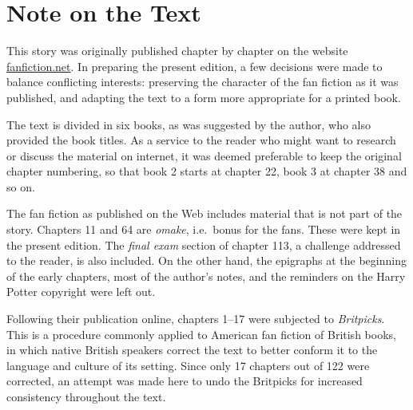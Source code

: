


\frontmatter
\newcommand{\hpBookNo}{1}
\newcommand{\hpBookChar}{Harry James Potter-Evans-Verres}
\newcommand{\hpBookTitle}{Methods of Rationality}


\cleartorecto
\chapter{Note on the Text}
This story was originally published chapter by chapter on the website
\href{https://www.fanfiction.net/s/5782108/1/Harry-Potter-and-the-Methods-of-Rationality}{\UrlFont fanfiction.net}.
In preparing the present edition, a few decisions were made to balance
conflicting interests: preserving the character of the fan fiction as it was
published, and adapting the text to a form more appropriate for a printed book.

The text is divided in six books, as was suggested by the author, who also
provided the book titles. As a service to the reader who might want to research
or discuss the material on internet, it was deemed preferable to keep the
original chapter numbering, so that book 2 starts at chapter 22, book 3 at
chapter 38 and so on.

The fan fiction as published on the Web includes material that is not part of
the story. Chapters 11 and 64 are \emph{omake}, i.e.\ bonus for the fans. These
were kept in the present edition. The \emph{final exam} section of chapter 113,
a challenge addressed to the reader, is also included. On the other hand, the
epigraphs at the beginning of the early chapters, most of the author's notes,
and the reminders on the Harry Potter copyright were left out.

\label{britpick note}Following their publication online, chapters 1--17 were subjected to
\emph{Britpicks}. This is a procedure commonly applied to American fan fiction
of British books, in which native British speakers correct the text to better
conform it to the language and culture of its setting. Since only 17 chapters
out of 122 were corrected, an attempt was made here to undo the Britpicks for
increased consistency throughout the text.

